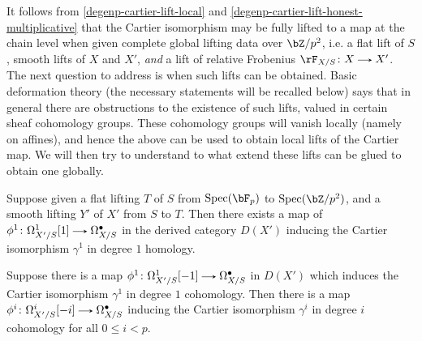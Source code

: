 It follows from \cref{degenp-cartier-lift-local} and \cref{degenp-cartier-lift-honest-multiplicative} that the Cartier isomorphism may be fully lifted to a map at the chain level when given complete global lifting data over $\bZ/p^2$, i.e. a flat lift of $S$, smooth lifts of $X$ and $X'$, \emph{and} a lift of relative Frobenius $\rF_{X/S} \c X \to X'$. The next question to address is when such lifts can be obtained. Basic deformation theory (the necessary statements will be recalled below) says that in general there are obstructions to the existence of such lifts, valued in certain sheaf cohomology groups. These cohomology groups will vanish locally (namely on affines), and hence the above can be used to obtain local lifts of the Cartier map. We will then try to understand to what extend these lifts can be glued to obtain one globally.

\begin{proposition}
  \label{degenp-cartier-lift-global}
  Suppose given a flat lifting $T$ of $S$ from $\Spec(\bF_p)$ to $\Spec(\bZ/p^2)$, and a smooth lifting  $Y'$ of $X'$ from $S$ to $T$. Then there exists a map of $\phi^1 \c \Omega_{X'/S}^1[1] \to \Omega_{X/S}^\bullet$ in the derived category $D(X')$ inducing the Cartier isomorphism $\gamma^1$ in degree $1$ homology.
\end{proposition}

\begin{lemma}
  \label{degen--lift--extend}
  Suppose there is a map $\phi^1 \c \Omega_{X'/S}^1[-1] \to \Omega_{X/S}^\bullet$ in $D(X')$ which induces the Cartier isomorphism $\gamma^1$ in degree $1$ cohomology. Then there is a map $\phi^i \c \Omega_{X'/S}^i[-i] \to \Omega_{X/S}^\bullet$ inducing the Cartier isomorphism $\gamma^i$ in degree $i$ cohomology for all $0 \le i < p$.
\end{lemma}

